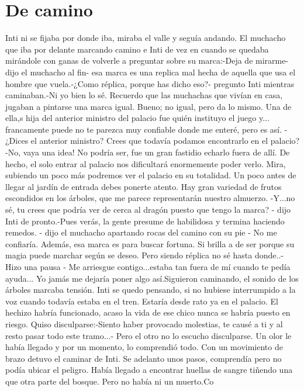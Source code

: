 
\chapter{De camino}

Inti ni se fijaba por donde iba, miraba el valle y seguía andando. El muchacho que iba por delante marcando camino e Inti de vez en cuando se quedaba mirándole con ganas de volverle a preguntar sobre su marca:-Deja de mirarme- dijo el muchacho al fin- esa marca es una replica mal hecha de aquella que usa el hombre que vuela.-¿Como réplica, porque has dicho eso?- pregunto Inti mientras caminaban.-Ni yo bien lo sé. Recuerdo que las muchachas que vivían en casa, jugaban a pintarse una marca igual. Bueno; no igual, pero da lo mismo. Una de ella,s hija del anterior ministro del palacio fue quién instituyo el juego y... francamente puede no te parezca muy confiable donde me enteré, pero es así. -¿Dices el anterior ministro? Crees que todavía podamos encontrarlo en el palacio?-No, vaya una idea! No podría ser, fue un gran fastidio echarlo fuera de allí. De hecho, el solo entrar al palacio nos dificultará enormemente poder verlo. Mira, subiendo un poco más podremos ver el palacio en su totalidad. Un poco antes de llegar al jardín de entrada debes ponerte atento. Hay gran variedad de frutos escondidos en los árboles, que me parece representarán nuestro almuerzo. -Y...no sé, tu crees que podría ver de cerca al dragón puesto que tengo la marca? - dijo Inti de pronto.-Pues verás, la gente presume de habilidosa y termina haciendo remedos. - dijo el muchacho apartando rocas del camino con su pie - No me confiaría. Además, esa marca es para buscar fortuna. Si brilla a de ser porque su magia puede marchar según se deseo. Pero siendo réplica no sé hasta donde..- Hizo una pausa - Me arriesgue contigo...estaba tan fuera de mí cuando te pedía ayuda... Yo jamás me dejaría poner algo así.Siguieron caminando, el sonido de los árboles marcaba tensión. Inti se quedo pensando, si no hubiese interrumpido a la voz cuando todavía estaba en el tren. Estaría desde rato ya en el palacio. El hechizo habría funcionado, acaso la vida de ese chico nunca se habría puesto en riesgo. Quiso disculparse:-Siento haber provocado molestias, te causé a ti y al resto pasar todo este tramo...- Pero el otro no lo escucho disculparse. Un olor le había llegado y por un momento, lo comprendió todo. Con un movimiento de brazo detuvo el caminar de Inti. Se adelanto unos pasos, comprendía pero no podía ubicar el peligro. Había llegado a encontrar huellas de sangre tiñendo una que otra parte del bosque. Pero no había ni un muerto.Co
